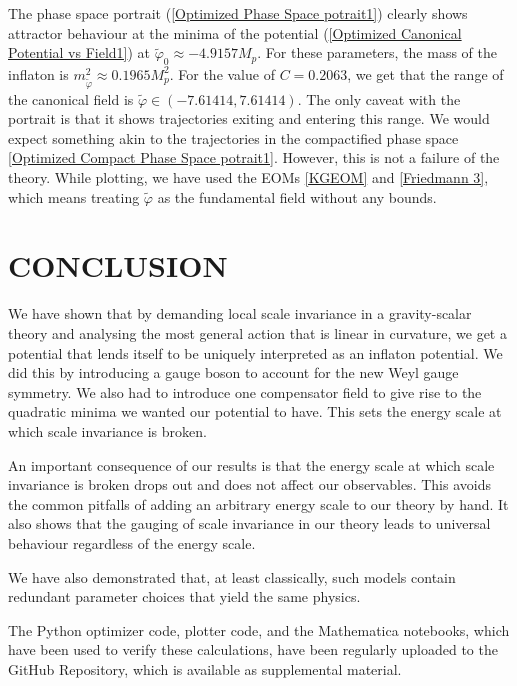 \documentclass[aps,prd,reprint,preprintnumbers,showpacs,floatfix,nofootinbib,superscript address]{revtex4-2}
\newcommand{\wb}[1]{{\color[RGB]{255,0,0}{\textbf{\textit{[WB: #1]}}}}}
\begin{document}
The phase space portrait (\cref{Optimized Phase Space potrait1}) clearly shows attractor behaviour at the minima of the potential (\cref{Optimized Canonical Potential vs Field1}) at $\tilde{\varphi}_0 \approx -4.9157 M_p$. For these parameters, the mass of the inflaton is $m_{\tilde{\varphi}}^2 \approx  0.1965 M_p^2$. For the value of $C = 0.2063$, we get that the range of the canonical field is $\tilde{\varphi} \in (-7.61414,7.61414)$. The only caveat with the portrait is that it shows trajectories exiting and entering this range. We would expect something akin to the trajectories in the compactified phase space \cref{Optimized Compact Phase Space potrait1}. However, this is not a failure of the theory. While plotting, we have used the EOMs \cref{KGEOM} and \cref{Friedmann 3}, which means treating $\tilde{\varphi}$ as the fundamental field without any bounds.


\section{CONCLUSION}
We have shown that by demanding local scale invariance in a gravity-scalar theory and analysing the most general action that is linear in curvature, we get a potential that lends itself to be uniquely interpreted as an inflaton potential. We did this by introducing a gauge boson to account for the new Weyl gauge symmetry. We also had to introduce one compensator field to give rise to the quadratic minima we wanted our potential to have. This sets the energy scale at which scale invariance is broken.

An important consequence of our results is that the energy scale at which scale invariance is broken drops out and does not affect our observables. This avoids the common pitfalls of adding an arbitrary energy scale to our theory by hand. It also shows that the gauging of scale invariance in our theory leads to universal behaviour regardless of the energy scale.

We have also demonstrated that, at least classically, such models contain redundant parameter choices that yield the same physics. 

The Python optimizer code, plotter code, and the Mathematica notebooks, which have been used to verify these calculations, have been regularly\wb{Not sure what regularly means here.} uploaded to the GitHub Repository, which is available as supplemental material. 

\newpage
\,\,
\newpage

\appendix
\end{document}
